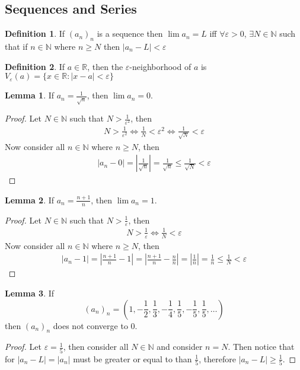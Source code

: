 \documentclass[12pt]{article}
\theoremstyle{definition}
\newtheorem{definition}{Definition}
\theoremstyle{definition}
\theoremstyle{definition}
\newtheorem{lemma}{Lemma}
\theoremstyle{definition}
\begin{document}
\begin{flushleft}

\section{Sequences and Series}
\begin{definition}
    If $(a_n)_n$ is a sequence then $\lim a_n = L$ iff $\forall\varepsilon > 0$, $\exists N \in \mathbb{N}$ such that if $n \in \mathbb{N}$ where $n \geq N$ then $|a_n - L| < \varepsilon$
\end{definition}
\begin{definition}
    If $a \in \mathbb{R}$, then the $\varepsilon$-neighborhood of $a$ is $V_\varepsilon(a) = \{ x \in \mathbb{R} : |x - a| < \varepsilon \}$
\end{definition}
\begin{lemma}
    If $a_n = \frac{1}{\sqrt{n}}$, then $\lim a_n = 0$.
\end{lemma}
\begin{proof}
    Let $N \in \mathbb{N}$ such that $N > \frac{1}{\varepsilon^2}$, then
    \begin{align*}
        N > \frac{1}{\varepsilon^2} \iff \frac{1}{N} < \varepsilon^2 \iff \frac{1}{\sqrt{N}} < \varepsilon
    \end{align*}
    Now consider all $n \in \mathbb{N}$ where $n \geq N$, then
    \begin{align*}
        |a_n - 0| = \left|\frac{1}{\sqrt{n}}\right| = \frac{1}{\sqrt{n}} \leq \frac{1}{\sqrt{N}} < \varepsilon
    \end{align*}
\end{proof}
\begin{lemma}
    If $a_n = \frac{n + 1}{n}$, then $\lim a_n = 1$.
\end{lemma}
\begin{proof}
    Let $N \in \mathbb{N}$ such that $N > \frac{1}{\varepsilon}$, then
    \begin{align*}
        N > \frac{1}{\varepsilon} \iff \frac{1}{N} < \varepsilon
    \end{align*}
    Now consider all $n \in \mathbb{N}$ where $n \geq N$, then
    \begin{align*}
        |a_n - 1|
        = \left|\frac{n + 1}{n} - 1\right|
        = \left|\frac{n + 1}{n} - \frac{n}{n}\right|
        = \left|\frac{1}{n}\right|
        = \frac{1}{n}
        \leq \frac{1}{N}
        < \varepsilon
    \end{align*}
\end{proof}
\begin{lemma}
    If \[
        (a_n)_n = \left(1, -\frac{1}{2}, \frac{1}{3}, -\frac{1}{4}, \frac{1}{5}, -\frac{1}{5}, \frac{1}{5}, \ldots\right)
    \]
    then $(a_n)_n$ does not converge to $0$.
\end{lemma}
\begin{proof}
    Let $\varepsilon = \frac{1}{5}$, then consider all $N \in \mathbb{N}$ and consider $n = N$. Then notice that for $|a_n - L| = |a_n|$ must be greater or equal to than $\frac{1}{5}$, therefore $|a_n - L| \geq \frac{1}{5}$.
\end{proof}


\end{flushleft}
\end{document}
